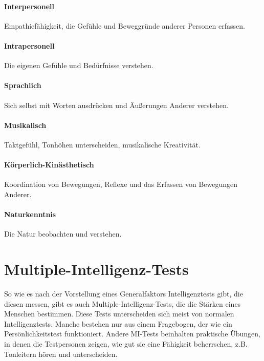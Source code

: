 \paragraph{Interpersonell}
Empathiefähigkeit, die Gefühle und Beweggründe anderer Personen erfassen.
\paragraph{Intrapersonell}
Die eigenen Gefühle und Bedürfnisse verstehen.
\paragraph{Sprachlich}
Sich selbst mit Worten ausdrücken und Äußerungen Anderer verstehen.
\paragraph{Musikalisch}
Taktgefühl, Tonhöhen unterscheiden, musikalische Kreativität.
\paragraph{Körperlich-Kinästhetisch}
Koordination von Bewegungen, Reflexe und das Erfassen von Bewegungen Anderer.
\paragraph{Naturkenntnis}
Die Natur beobachten und verstehen.

\section{Multiple-Intelligenz-Tests}
So wie es nach der Vorstellung eines Generalfaktors Intelligenztests gibt, die diesen messen, gibt es auch Multiple-Intelligenz-Tests, die die \glqq Stärken\grqq{} eines Menschen bestimmen. Diese Tests unterscheiden sich meist von normalen Intelligenztests. Manche bestehen nur aus einem Fragebogen, der wie ein Persönlichkeitstest funktioniert.
Andere MI-Tests beinhalten praktische Übungen, in denen die Testpersonen zeigen, wie gut sie eine Fähigkeit beherrschen, z.B. Tonleitern hören und unterscheiden.
